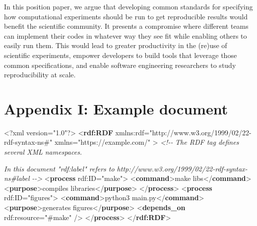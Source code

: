 \documentclass[manuscript,authordraft]{acmart}
\newenvironment{Shaded}{}{}
\newcommand{\CommentTok}[1]{\textcolor[rgb]{0.38,0.63,0.69}{\textit{#1}}}
\newcommand{\FunctionTok}[1]{\textcolor[rgb]{0.02,0.16,0.49}{#1}}
\newcommand{\KeywordTok}[1]{\textcolor[rgb]{0.00,0.44,0.13}{\textbf{#1}}}
\newcommand{\NormalTok}[1]{#1}
\newcommand{\OtherTok}[1]{\textcolor[rgb]{0.00,0.44,0.13}{#1}}
\newcommand{\StringTok}[1]{\textcolor[rgb]{0.25,0.44,0.63}{#1}}
\begin{document}
In this position paper, we argue that developing common standards for
specifying how computational experiments should be run to get
reproducible results would benefit the scientific community. It presents
a compromise where different teams can implement their codes in whatever
way they see fit while enabling others to easily run them. This would
lead to greater productivity in the (re)use of scientific experiments,
empower developers to build tools that leverage those common
specifications, and enable software engineering researchers to study
reproducibility at scale.

\hypertarget{appendix-i-example-document}{%
\section{Appendix I: Example
document}\label{appendix-i-example-document}}

\begin{Shaded}
\begin{Highlighting}[]
\FunctionTok{\textless{}?xml}\OtherTok{ version=}\StringTok{"1.0"}\FunctionTok{?\textgreater{}}
\NormalTok{\textless{}}\KeywordTok{rdf:RDF}
\OtherTok{  xmlns:rdf=}\StringTok{"http://www.w3.org/1999/02/22{-}rdf{-}syntax{-}ns\#"}
\OtherTok{  xmlns=}\StringTok{"https://example.com/"}
\NormalTok{\textgreater{}}
\CommentTok{\textless{}!{-}{-}}
\CommentTok{The RDF tag defines several XML namespaces.}

\CommentTok{In this document "rdf:label" refers to http://www.w3.org/1999/02/22{-}rdf{-}syntax{-}ns\#label}
\CommentTok{{-}{-}\textgreater{}}
\NormalTok{\textless{}}\KeywordTok{process}\OtherTok{ rdf:ID=}\StringTok{"make"}\NormalTok{\textgreater{}}
\NormalTok{  \textless{}}\KeywordTok{command}\NormalTok{\textgreater{}make libs\textless{}/}\KeywordTok{command}\NormalTok{\textgreater{}}
\NormalTok{  \textless{}}\KeywordTok{purpose}\NormalTok{\textgreater{}compiles libraries\textless{}/}\KeywordTok{purpose}\NormalTok{\textgreater{}}
\NormalTok{\textless{}/}\KeywordTok{process}\NormalTok{\textgreater{}}
\NormalTok{\textless{}}\KeywordTok{process}\OtherTok{ rdf:ID=}\StringTok{"figures"}\NormalTok{\textgreater{}}
\NormalTok{  \textless{}}\KeywordTok{command}\NormalTok{\textgreater{}python3 main.py\textless{}/}\KeywordTok{command}\NormalTok{\textgreater{}}
\NormalTok{  \textless{}}\KeywordTok{purpose}\NormalTok{\textgreater{}generates figures\textless{}/}\KeywordTok{purpose}\NormalTok{\textgreater{}}
\NormalTok{  \textless{}}\KeywordTok{depends\_on}\OtherTok{ rdf:resource=}\StringTok{"\#make"}\NormalTok{ /\textgreater{}}
\NormalTok{\textless{}/}\KeywordTok{process}\NormalTok{\textgreater{}}
\NormalTok{\textless{}/}\KeywordTok{rdf:RDF}\NormalTok{\textgreater{}}
\end{Highlighting}
\end{Shaded}
\end{document}
